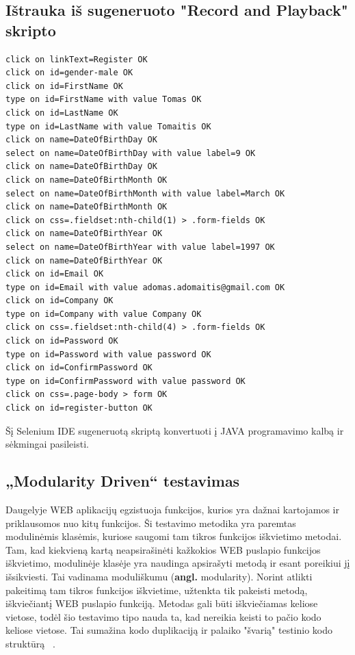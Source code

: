 \documentclass[a4paper,12pt,fleqn]{article}
\begin{document}
\subsection{Ištrauka iš sugeneruoto "Record and Playback" skripto}
\begin{lstlisting}[caption={"Record and Playback" tipo testas.}]
click on linkText=Register OK
click on id=gender-male OK
click on id=FirstName OK
type on id=FirstName with value Tomas OK
click on id=LastName OK
type on id=LastName with value Tomaitis OK
click on name=DateOfBirthDay OK
select on name=DateOfBirthDay with value label=9 OK
click on name=DateOfBirthDay OK
click on name=DateOfBirthMonth OK
select on name=DateOfBirthMonth with value label=March OK
click on name=DateOfBirthMonth OK
click on css=.fieldset:nth-child(1) > .form-fields OK
click on name=DateOfBirthYear OK
select on name=DateOfBirthYear with value label=1997 OK
click on name=DateOfBirthYear OK
click on id=Email OK
type on id=Email with value adomas.adomaitis@gmail.com OK
click on id=Company OK
type on id=Company with value Company OK
click on css=.fieldset:nth-child(4) > .form-fields OK
click on id=Password OK
type on id=Password with value password OK
click on id=ConfirmPassword OK
type on id=ConfirmPassword with value password OK
click on css=.page-body > form OK
click on id=register-button OK
\end{lstlisting}
Šį Selenium IDE sugeneruotą skriptą konvertuoti į JAVA programavimo kalbą ir sėkmingai pasileisti.

\subsection{„Modularity Driven“ testavimas}
Daugelyje WEB aplikacijų egzistuoja funkcijos, kurios yra dažnai kartojamos ir priklausomos nuo kitų funkcijos. Ši testavimo metodika yra paremtas modulinėmis klasėmis, kuriose saugomi tam tikros funkcijos iškvietimo metodai. Tam, kad kiekvieną kartą neapsirašinėti kažkokios WEB puslapio funkcijos iškvietimo, modulinėje klasėje yra naudinga apsirašyti metodą ir esant poreikiui jį išsikviesti. Tai vadinama moduliškumu (\textbf{angl.} modularity). Norint atlikti pakeitimą tam tikros funkcijos iškvietime, užtenkta tik pakeisti metodą, iškviečiantį WEB puslapio funkciją. Metodas gali būti iškviečiamas keliose vietose, todėl šio testavimo tipo nauda ta, kad nereikia keisti to pačio kodo keliose vietose. Tai sumažina kodo duplikaciją ir palaiko "švarią" testinio kodo struktūrą ~\cite{kelly2003choosing}.
\end{document}
